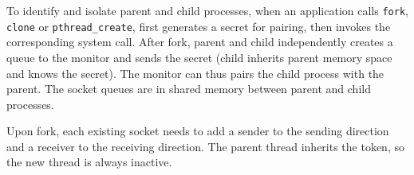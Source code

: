 To identify and isolate parent and child processes, when an application calls \texttt{fork}, \texttt{clone} or \texttt{pthread\_create}, \libipc{} first generates a secret for pairing, then invokes the corresponding system call. After fork, parent and child independently creates a queue to the monitor and sends the secret (child inherits parent memory space and knows the secret). The monitor can thus pairs the child process with the parent. 
The socket queues are in shared memory between parent and child processes.

Upon fork, each existing socket needs to add a sender to the sending direction and a receiver to the receiving direction.
The parent thread inherits the token, so the new thread is always inactive.




